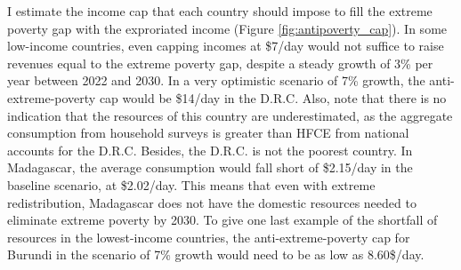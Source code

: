 I estimate the income cap that each country should impose to fill the extreme poverty gap with the exproriated income (Figure \ref{fig:antipoverty_cap}). 
In some low-income countries, even capping incomes at \$7/day would not suffice to raise revenues equal to the extreme poverty gap, despite a steady growth of 3\% per year between 2022 and 2030. 
In a very optimistic scenario of 7\% growth, the anti-extreme-poverty cap would be \$14/day in the D.R.C. Also, note that there is no indication that the resources of this country are underestimated, as the aggregate consumption from household surveys is greater than HFCE %
from national accounts for the D.R.C. 
Besides, the D.R.C. is not the poorest country. 
In Madagascar, the average consumption would fall short of \$2.15/day in the baseline scenario, at \$2.02/day. This means that even with extreme redistribution, Madagascar does not have the domestic resources needed to eliminate extreme poverty by 2030. 
To give one last example of the shortfall of resources in the lowest-income countries, the anti-extreme-poverty cap for Burundi in the scenario of 7\% growth would need to be as low as 8.60\$/day. 

